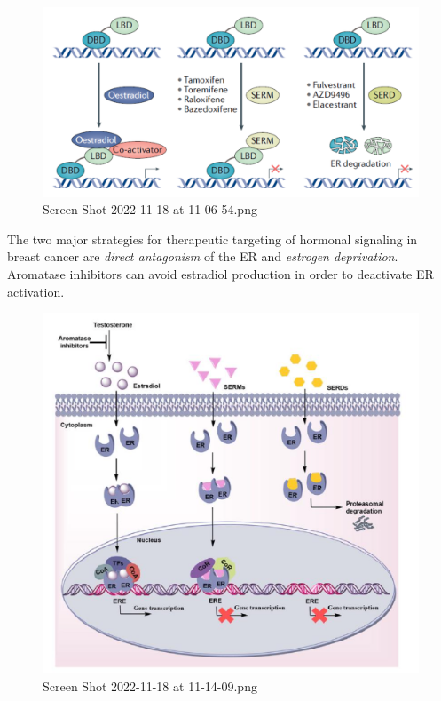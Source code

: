 \begin{figure}
\centering
\includegraphics[width=\textwidth]{../_resources/Screen_Shot_2022-11-18_at_11-06-54.png}
\caption{Screen Shot 2022-11-18 at 11-06-54.png}
\end{figure}

The two major strategies for therapeutic targeting of hormonal signaling in breast cancer are \emph{direct antagonism} of the ER and \emph{estrogen deprivation}. Aromatase inhibitors can avoid estradiol production in order to deactivate ER activation.

\begin{figure}
\centering
\includegraphics[width=\textwidth]{../_resources/Screen_Shot_2022-11-18_at_11-14-09.png}
\caption{Screen Shot 2022-11-18 at 11-14-09.png}
\end{figure}


